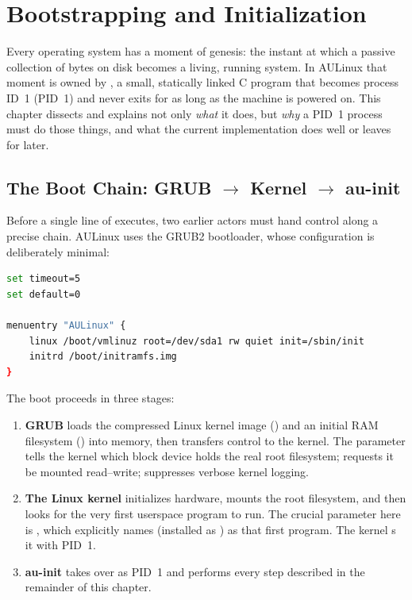 \chapter{Bootstrapping and Initialization}
\label{chap:init}

Every operating system has a moment of genesis: the instant at which a passive
collection of bytes on disk becomes a living, running system. In AULinux that
moment is owned by , a small, statically linked C program that
becomes process ID~1 (PID~1) and never exits for as long as the machine is
powered on. This chapter dissects  and explains not only
\emph{what} it does, but \emph{why} a PID~1 process must do those things, and
what the current implementation does well or leaves for later.

\section{The Boot Chain: GRUB \texorpdfstring{$\rightarrow$}{->} Kernel \texorpdfstring{$\rightarrow$}{->} au-init}

Before a single line of  executes, two earlier actors must hand
control along a precise chain. AULinux uses the GRUB2 bootloader, whose
configuration is deliberately minimal:

\begin{lstlisting}[language=bash, caption={The complete GRUB configuration (bootloader/grub.cfg)}]
set timeout=5
set default=0

menuentry "AULinux" {
    linux /boot/vmlinuz root=/dev/sda1 rw quiet init=/sbin/init
    initrd /boot/initramfs.img
}
\end{lstlisting}

The boot proceeds in three stages:

\begin{enumerate}
  \item \textbf{GRUB} loads the compressed Linux kernel image
        () and an initial RAM filesystem
        () into memory, then transfers control to the
        kernel. The  parameter tells the kernel which block
        device holds the real root filesystem;  requests it be mounted
        read--write;  suppresses verbose kernel logging.
  \item \textbf{The Linux kernel} initializes hardware, mounts the root
        filesystem, and then looks for the very first userspace program to run.
        The crucial parameter here is , which explicitly
        names  (installed as ) as that first
        program. The kernel s it with PID~1.
  \item \textbf{au-init} takes over as PID~1 and performs every step described
        in the remainder of this chapter.
\end{enumerate}

